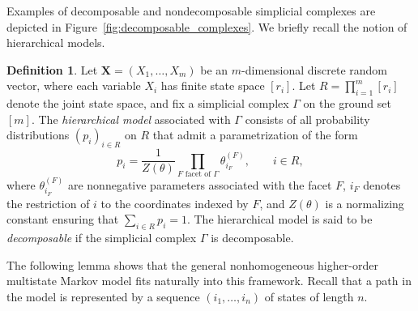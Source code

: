 \documentclass[11pt, a4paper]{article}
\numberwithin{equation}{section}
\theoremstyle{plain}
\theoremstyle{definition}
\newtheorem{definition}[theorem]{Definition}
\renewcommand{\emph}[1]{\textit{#1}}
\begin{document}
Examples of decomposable  and nondecomposable  simplicial complexes are depicted in Figure~\ref{fig:decomposable_complexes}. We briefly recall the notion of hierarchical models.
\begin{definition} \label{def:hierarchical_model}
Let $\textbf{X} = (X_1, \ldots, X_m)$ be an $m$-dimensional discrete random vector, where each
variable $X_i$ has finite state space $[r_i]$.
Let $\textstyle{R=\prod_{i=1}^m [r_i]}$ denote the joint state space, and fix a simplicial
complex $\Gamma$ on the ground set $[m]$.
The \emph{hierarchical model} associated with $\Gamma$ consists of all probability
distributions $(p_i)_{i\in R}$ on $R$ that admit a parametrization of the form
\begin{equation}
\label{eq:hierarchical model}
p_i
=
\frac{1}{Z(\theta)}
\prod_{F \text{ facet of } \Gamma}
\theta^{(F)}_{i_F},
\qquad i\in R,
\end{equation}
where $\theta^{(F)}_{i_F}$ are nonnegative parameters associated with the facet $F$,
$i_F$ denotes the restriction of $i$ to the coordinates indexed by $F$,
and $Z(\theta)$ is a normalizing constant ensuring that $\textstyle{\sum_{i\in R} p_i = 1}$.
The hierarchical model is said to be \emph{decomposable} if the simplicial complex
$\Gamma$ is decomposable.
\end{definition}

The following lemma shows that the general nonhomogeneous higher-order multistate
Markov model fits naturally into this framework. Recall that a path in the model is represented by a sequence $(i_1,\ldots,i_n)$ of states of length $n$.
\end{document}

